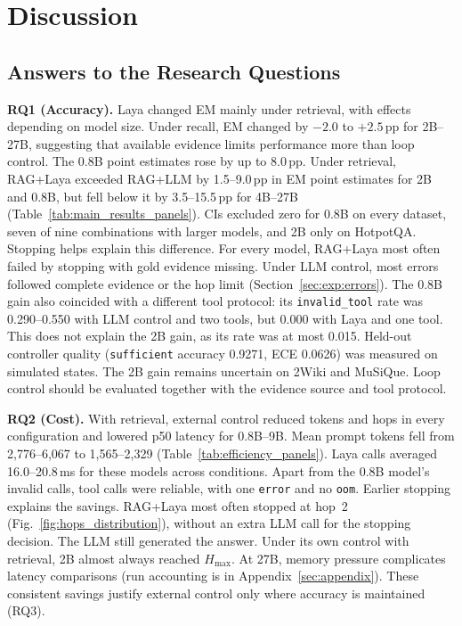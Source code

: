 \section{Discussion}
\label{sec:discussion}

\subsection{Answers to the Research Questions}
\label{sec:disc:rq}

\textbf{RQ1 (Accuracy).} Laya changed EM mainly under retrieval, with effects depending
on model size. Under recall, EM changed by $-2.0$ to $+2.5$\,pp for 2B--27B,
suggesting that available evidence limits performance more than loop control.
The 0.8B point estimates rose by up to 8.0\,pp. Under retrieval, RAG+Laya exceeded
RAG+LLM by 1.5--9.0\,pp in EM point estimates for 2B and 0.8B, but fell below it
by 3.5--15.5\,pp for 4B--27B
(Table~\ref{tab:main_results_panels}). CIs excluded zero for 0.8B on every dataset,
seven of nine combinations with larger models, and 2B only on HotpotQA. Stopping helps
explain this difference. For every model, RAG+Laya most often failed by stopping with
gold evidence missing. Under LLM control, most errors followed complete evidence or the hop limit
(Section~\ref{sec:exp:errors}). The 0.8B gain also coincided with a different tool
protocol: its \texttt{invalid\_tool} rate was 0.290--0.550 with LLM control and two
tools, but 0.000 with Laya and one tool. This does not explain the 2B gain, as its rate
was at most 0.015. Held-out controller quality (\texttt{sufficient} accuracy 0.9271,
ECE 0.0626) was measured on simulated states. The 2B gain remains uncertain on 2Wiki
and MuSiQue. Loop control should be
evaluated together with the evidence source and tool protocol.

\textbf{RQ2 (Cost).} With retrieval, external control reduced tokens and hops in every
configuration and lowered p50 latency for 0.8B--9B. Mean prompt tokens fell from
2{,}776--6{,}067 to 1{,}565--2{,}329 (Table~\ref{tab:efficiency_panels}). Laya calls
averaged 16.0--20.8\,ms for these models across conditions.
Apart from the 0.8B model's invalid calls, tool calls were reliable, with one
\texttt{error} and no \texttt{oom}. Earlier stopping explains the savings. RAG+Laya
most often stopped at hop~2 (Fig.~\ref{fig:hops_distribution}), without an extra LLM
call for the stopping decision. The LLM still generated the answer. Under its own
control with retrieval, 2B almost always reached $H_{\max}$. At 27B,
memory pressure complicates latency comparisons (run accounting is in
Appendix~\ref{sec:appendix}). These consistent savings justify external control only
where accuracy is maintained (RQ3).


